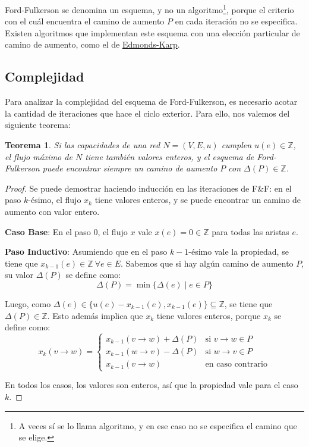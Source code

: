 \documentclass[a4paper]{report}
\newcommand{\si}{\text{si }}
\newcommand{\ecc}{\text{en caso contrario}}
\newcommand{\Z}{\mathbb{Z}}
\newtheorem*{theorem*}{Teorema}
\begin{document}
Ford-Fulkerson se denomina un esquema, y no un algoritmo\footnote{A veces sí se lo llama algoritmo, y en ese caso no se especifica el camino que se elige.}, porque el criterio con el cuál encuentra el camino de aumento $P$ en cada iteración no se especifica. Existen algoritmos que implementan este esquema con una elección particular de camino de aumento, como el de \hyperref[edmonds-karp]{Edmonds-Karp}.

\subsection{Complejidad}
Para analizar la complejidad del esquema de Ford-Fulkerson, es necesario acotar la cantidad de iteraciones que hace el ciclo exterior. Para ello, nos valemos del siguiente teorema:

\begin{theorem*}
    Si las capacidades de una red $N = (V, E, u)$ cumplen $u(e) \in \Z$, el flujo máximo de $N$ tiene también valores enteros, y el esquema de \textit{Ford-Fulkerson} puede encontrar siempre un camino de aumento $P$ con $\Delta(P) \in \Z$.
\end{theorem*}
\begin{proof}
    Se puede demostrar haciendo inducción en las iteraciones de F\&F: en el paso $k$-ésimo, el flujo $x_k$ tiene valores enteros, y se puede encontrar un camino de aumento con valor entero.

    \textbf{Caso Base}: En el paso $0$, el flujo $x$ vale $x(e) = 0 \in \Z$ para todas las aristas $e$.

    \textbf{Paso Inductivo}: Asumiendo que en el paso $k - 1$-ésimo vale la propiedad, se tiene que $x_{k - 1}(e) \in \Z\ \forall e \in E$. Sabemos que si hay algún camino de aumento $P$, su valor $\Delta(P)$ se define como:
    $$\Delta(P) = \min{\{\Delta(e) \mid e \in P\}}$$

    Luego, como $\Delta(e) \in \{u(e) - x_{k - 1}(e), x_{k - 1}(e)\} \subseteq \Z$, se tiene que $\Delta(P) \in \Z$. Esto además implica que $x_k$ tiene valores enteros, porque $x_k$ se define como:
    $$
        x_k(v \rightarrow w) =
        \begin{cases}
            x_{k - 1}(v \rightarrow w) + \Delta(P) & \si v \rightarrow w \in P \\
            x_{k - 1}(w \rightarrow v) - \Delta(P) & \si w \rightarrow v \in P \\
            x_{k - 1}(v \rightarrow w)             & \ecc
        \end{cases}$$

    En todos los casos, los valores son enteros, así que la propiedad vale para el caso $k$.

\end{proof}
\end{document}
